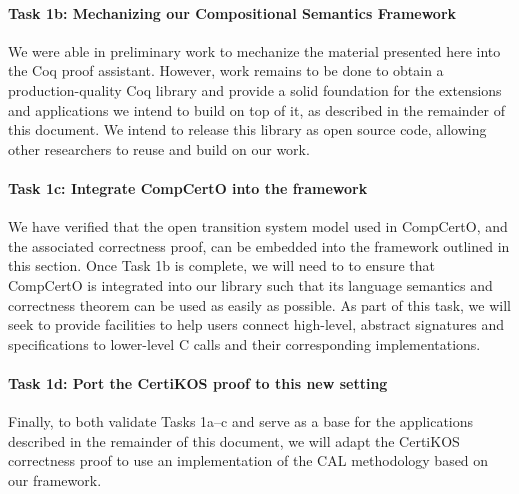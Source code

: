 \vspace*{-2ex}
\paragraph*{Task 1b: Mechanizing our Compositional Semantics Framework}

We were able in preliminary work to mechanize the material presented here
into the Coq proof assistant.
However,
work remains to be done to obtain a production-quality Coq library
and provide a solid foundation for the extensions and applications
we intend to build on top of it,
as described in the remainder of this document.
We intend to release this library as open source code,
allowing other researchers to reuse and build on our work.

\vspace*{-2ex}
\paragraph*{Task 1c: Integrate CompCertO into the framework}

We have verified that the open transition system model used in CompCertO,
and the associated correctness proof,
can be embedded into the framework outlined in this section.
Once Task 1b is complete,
we will need to to ensure that CompCertO is integrated into our library
such that its language semantics and correctness theorem can be used
as easily as possible.
As part of this task,
we will seek to provide facilities
to help users connect high-level, abstract signatures and specifications
to lower-level C calls and their corresponding implementations.

\vspace*{-2ex}
\paragraph*{Task 1d: Port the CertiKOS proof to this new setting}

Finally,
to both validate Tasks 1a--c and serve as a base
for the applications described in the remainder of this document,
we will adapt the CertiKOS correctness proof \cite{dscal15}
to use an implementation of the CAL methodology based on our framework.

